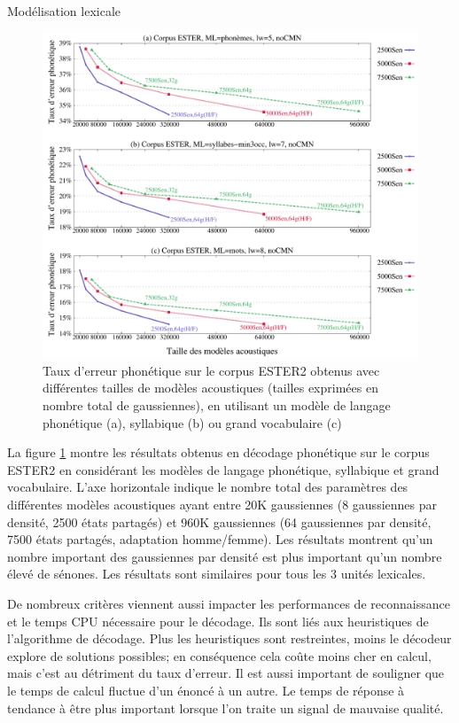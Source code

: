 \documentclass{style/these}
\begin{document}
\begin{part}{Modélisation lexicale}
\begin{figure}[h!]
\centering
\includegraphics[scale=0.54]{images/results/results_AM_ESTER.pdf}
\caption{Taux d'erreur phonétique sur le corpus ESTER2 obtenus avec différentes tailles de modèles acoustiques (tailles exprimées en nombre total de gaussiennes), en utilisant un modèle de langage phonétique (a), syllabique (b) ou grand vocabulaire (c)}
\label{Fig:tailleAM-PER}
\end{figure}


La figure \ref{Fig:tailleAM-PER} montre les résultats obtenus en décodage phonétique sur le corpus ESTER2 en considérant les modèles de langage phonétique, syllabique et grand vocabulaire. 
L'axe horizontale indique le nombre total des paramètres des différentes modèles acoustiques ayant entre 20K gaussiennes (8 gaussiennes par densité, 2500 états partagés) et 960K gaussiennes (64 gaussiennes par densité, 7500 états partagés, adaptation homme/femme). 
Les résultats montrent qu'un nombre important des gaussiennes par densité est plus important qu'un nombre élevé de sénones. 
Les résultats sont similaires pour tous les 3 unités lexicales. 

De nombreux critères viennent aussi impacter les performances de reconnaissance et le temps CPU nécessaire pour le décodage. Ils sont liés aux heuristiques de l'algorithme de décodage. Plus les heuristiques sont restreintes, moins le décodeur explore de solutions possibles; en conséquence cela coûte moins cher en calcul, mais c'est au détriment du taux d'erreur. 
Il est aussi important de souligner que le temps de calcul fluctue d'un énoncé à un autre. Le temps de réponse à tendance à être plus important lorsque l'on traite un signal de mauvaise qualité.




\end{part}
\end{document}

